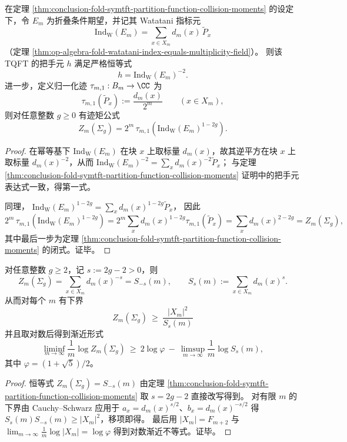 \begin{proposition}\label{prop:conclusion-watatani-handle-identity-trace-moment}
在定理 \ref{thm:conclusion-fold-symtft-partition-function-collision-moments} 的设定下，令 \(E_m\) 为折叠条件期望，并记其 Watatani 指标元
\[
\mathrm{Ind}_{\mathrm W}(E_m)=\sum_{x\in X_m}d_m(x)\,\widetilde P_x
\]
（定理 \ref{thm:op-algebra-fold-watatani-index-equals-multiplicity-field}）。
则该 TQFT 的把手元 \(h\) 满足严格恒等式
\[
h=\mathrm{Ind}_{\mathrm W}(E_m)^{-2}.
\]
进一步，定义归一化迹 \(\tau_{m,1}:B_m\to\CC\) 为
\[
\tau_{m,1}(\widetilde P_x):=\frac{d_m(x)}{2^m}\qquad(x\in X_m),
\]
则对任意整数 \(g\ge 0\) 有迹矩公式
\[
Z_m(\Sigma_g)=2^m\,\tau_{m,1}\!\left(\mathrm{Ind}_{\mathrm W}(E_m)^{1-2g}\right).
\]
\end{proposition}
\begin{proof}
在幂等基下 \(\mathrm{Ind}_{\mathrm W}(E_m)\) 在块 \(x\) 上取标量 \(d_m(x)\)，故其逆平方在块 \(x\) 上取标量 \(d_m(x)^{-2}\)，从而
\(
\mathrm{Ind}_{\mathrm W}(E_m)^{-2}=\sum_x d_m(x)^{-2}\widetilde P_x
\)；
与定理 \ref{thm:conclusion-fold-symtft-partition-function-collision-moments} 证明中的把手元表达式一致，得第一式。
\par
同理，
\(
\mathrm{Ind}_{\mathrm W}(E_m)^{1-2g}=\sum_x d_m(x)^{1-2g}\widetilde P_x
\)，
因此
\[
2^m\,\tau_{m,1}\!\left(\mathrm{Ind}_{\mathrm W}(E_m)^{1-2g}\right)
=2^m\sum_x d_m(x)^{1-2g}\tau_{m,1}(\widetilde P_x)
=\sum_x d_m(x)^{2-2g}
=Z_m(\Sigma_g),
\]
其中最后一步为定理 \ref{thm:conclusion-fold-symtft-partition-function-collision-moments} 的闭式。证毕。
\end{proof}

\begin{corollary}\label{cor:conclusion-tqft-genus-bound-by-positive-pressure}
对任意整数 \(g\ge 2\)，记 \(s:=2g-2>0\)，则
\[
Z_m(\Sigma_g)=\sum_{x\in X_m}d_m(x)^{-s}=S_{-s}(m),
\qquad
S_s(m):=\sum_{x\in X_m}d_m(x)^{s}.
\]
从而对每个 \(m\) 有下界
\[
\boxed{\;
Z_m(\Sigma_g)\ \ge\ \frac{|X_m|^2}{S_s(m)}\;}
\]
并且取对数后得到渐近形式
\[
\liminf_{m\to\infty}\frac{1}{m}\log Z_m(\Sigma_g)\ \ge\ 2\log\varphi\ -\ \limsup_{m\to\infty}\frac{1}{m}\log S_s(m),
\]
其中 \(\varphi=(1+\sqrt5)/2\)。
\end{corollary}
\begin{proof}
恒等式 \(Z_m(\Sigma_g)=S_{-s}(m)\) 由定理 \ref{thm:conclusion-fold-symtft-partition-function-collision-moments} 取 \(s=2g-2\) 直接改写得到。
对有限 \(m\) 的下界由 Cauchy--Schwarz 应用于 \(a_x=d_m(x)^{s/2}\)、\(b_x=d_m(x)^{-s/2}\) 得
\(
S_s(m)S_{-s}(m)\ge |X_m|^2
\)，移项即得。
最后用 \(|X_m|=F_{m+2}\) 与 \(\lim_{m\to\infty}\frac{1}{m}\log|X_m|=\log\varphi\) 得到对数渐近不等式。证毕。
\end{proof}

